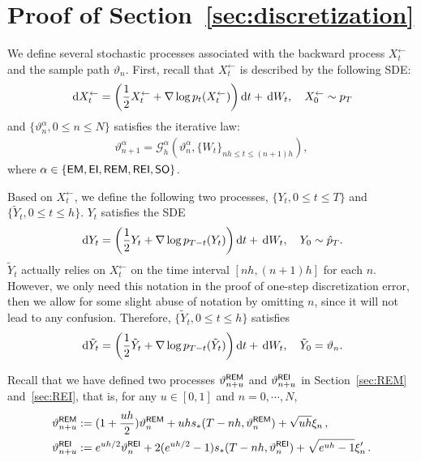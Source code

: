 \appendix

\section{Proof of Section~\ref{sec:discretization}}

We define several stochastic processes associated with the backward process $X_t^{\leftarrow}$ and the sample path $\vartheta_n$. First, recall that $X_t^{\leftarrow}$ is described by the following SDE:
\begin{align*}
    \rmd X_t^{\leftarrow}=\left(\dfrac{1}{2}X_t^{\leftarrow}+\nabla\log p_t(X_t^{\leftarrow})\right)\rmd t+\rmd W_t,\quad X_0^{\leftarrow}\sim p_T
\end{align*}
and $\{\vartheta_n^{\alpha},0\leqslant n\leqslant N\}$ satisfies the iterative law:
\begin{align*}
    \vartheta_{n+1}^{\alpha}=\mathcal{G}_h^{\alpha}(\vartheta_n^{\alpha},\{W_t\}_{nh\leqslant t\leqslant (n+1)h}),
\end{align*}
where $\alpha\in\{\sf EM,\sf EI,\sf REM,\sf REI,\sf SO\}$.

Based on $X_t^{\leftarrow}$, we define the following two processes, $\{Y_t,0\leqslant t\leqslant T\}$ and $\{\tilde{Y}_t,0\leqslant t\leqslant h\}$. $Y_t$ satisfies the SDE
\begin{align*}
    \rmd Y_t=\left(\dfrac{1}{2}Y_t+\nabla\log p_{T-t}(Y_t)\right)\rmd t+\rmd W_t,\quad Y_0\sim\hat p_T.
\end{align*}
$\tilde Y_t$ actually relies on $X_t^{\leftarrow}$ on the time interval $[nh,(n+1)h]$ for each $n$. However, we only need this notation in the proof of one-step discretization error, then we allow for some slight abuse of notation by omitting $n$, since it will not lead to any confusion. Therefore, $\{\tilde Y_t,0\leqslant t\leqslant h\}$ satisfies
\begin{align}
    \rmd\tilde Y_t=\left(\dfrac{1}{2}\tilde Y_t+\nabla\log p_{T-t}(\tilde Y_t)\right)\rmd t+\rmd W_t,\quad \tilde Y_0=\vartheta_n.
    \label{eq:tildeY}
\end{align}

Recall that we have defined two processes $\vartheta_{n+u}^{\sf REM}$ and $\vartheta_{n+u}^{\sf REI}$ in Section~\ref{sec:REM} and~\ref{sec:REI}, that is, for any $u\in[0,1]$ and $n=0,\cdots,N$, 
\begin{align*}
    \vartheta^{\sf REM}_{n+u}&:= (1+\frac{uh}{2})\vartheta_n^{\sf REM}+uhs_*(T-nh,\vartheta_n^{\sf REM})+\sqrt{uh}\xi_n\,,\\
    \vartheta_{n+u}^{\sf REI}&:=e^{uh/2}\vartheta^{\sf REI}_{n}+2(e^{uh/2}-1)s_*(T-nh,\vartheta^{\sf REI}_{n})+\sqrt{e^{uh}-1}\xi'_n\,.
\end{align*}

